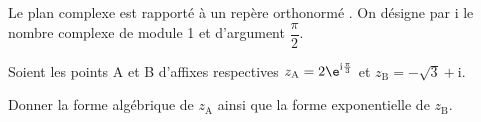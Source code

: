 \medskip

Le plan complexe est rapporté à un repère orthonormé \Ouv. On désigne par i le nombre complexe de module 1 et d'argument $\dfrac{\pi}{2}$.

Soient les points A et B d'affixes respectives $z_{\text{A}} = 2\e^{\text{i}\frac{\pi}{3}}$ et $z_{\text{B}} = -\sqrt 3 + \text{i}$.

Donner la forme algébrique de $z_{\text{A}}$ ainsi que la forme exponentielle de $z_{\text{B}}$.

\bigskip
